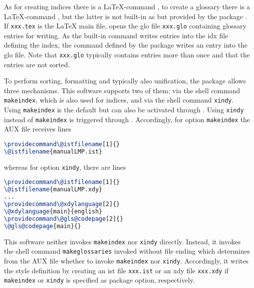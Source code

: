 As for creating indices there is a \LaTeX-command , 
to create a glossary there is a \LaTeX-command , 
but the latter is not built-in as  
but provided by the package . 
If \texttt{xxx.tex} is the \LaTeX{} main file, 
 opens the glo file \texttt{xxx.glo} 
containing glossary entries for writing. 
As the built-in command  
writes entries into the \gls{idx} file defining the index, 
the command  defined by the package  
writes an entry into the glo file. 
Note that \texttt{xxx.glo} typically contains entries more than once 
and that the entries are not sorted. 

To perform sorting, formatting and typically also unification, 
the package  allows three mechanisms. 
This software supports two of them: 
via the shell command \texttt{makeindex}, which is also used for indices, 
and via the shell command \texttt{xindy}. 
Using \texttt{makeindex} is the default but can also be activated through 
. 
Using \texttt{xindy} instead of \texttt{makeindex} is triggered through 
. 
Accordingly, for option \texttt{makeindex} the AUX file receives lines 
%
\begin{lstlisting}[language=TeX]
\providecommand\@istfilename[1]{}
\@istfilename{manualLMP.ist}
\end{lstlisting}
%
whereas for option \texttt{xindy}, there are lines 
%
\begin{lstlisting}[language=TeX]
\providecommand\@istfilename[1]{}
\@istfilename{manualLMP.xdy}
...
\providecommand\@xdylanguage[2]{}
\@xdylanguage{main}{english}
\providecommand\@gls@codepage[2]{}
\@gls@codepage{main}{}
\end{lstlisting}



This software neither invokes \texttt{makeindex} nor \texttt{xindy} directly. 
Instead, it invokes the shell command \texttt{makeglossaries}
invoked without file ending  
which determines from the AUX file 
whether to invoke \texttt{makeindex} nor \texttt{xindy}. 
Accordingly, it writes the style definition 
by creating an ist file \texttt{xxx.ist} or an xdy file \texttt{xxx.xdy} 
if \texttt{makeindex} or \texttt{xindy} is specified as package option, 
respectively. 

